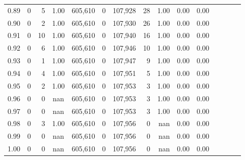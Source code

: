 \begin{tabular}{rrrcrrrrrrrrrrr}
0.89 &       0 &      5 &                                       1.00 &  605,610 &        0 &  107,928 &       28 &  1.00 &  0.00 &                         0.00 \\
0.90 &       0 &      2 &                                       1.00 &  605,610 &        0 &  107,930 &       26 &  1.00 &  0.00 &                         0.00 \\
0.91 &       0 &     10 &                                       1.00 &  605,610 &        0 &  107,940 &       16 &  1.00 &  0.00 &                         0.00 \\
0.92 &       0 &      6 &                                       1.00 &  605,610 &        0 &  107,946 &       10 &  1.00 &  0.00 &                         0.00 \\
0.93 &       0 &      1 &                                       1.00 &  605,610 &        0 &  107,947 &        9 &  1.00 &  0.00 &                         0.00 \\
0.94 &       0 &      4 &                                       1.00 &  605,610 &        0 &  107,951 &        5 &  1.00 &  0.00 &                         0.00 \\
0.95 &       0 &      2 &                                       1.00 &  605,610 &        0 &  107,953 &        3 &  1.00 &  0.00 &                         0.00 \\
0.96 &       0 &      0 &                                        nan &  605,610 &        0 &  107,953 &        3 &  1.00 &  0.00 &                         0.00 \\
0.97 &       0 &      0 &                                        nan &  605,610 &        0 &  107,953 &        3 &  1.00 &  0.00 &                         0.00 \\
0.98 &       0 &      3 &                                       1.00 &  605,610 &        0 &  107,956 &        0 &   nan &  0.00 &                         0.00 \\
0.99 &       0 &      0 &                                        nan &  605,610 &        0 &  107,956 &        0 &   nan &  0.00 &                         0.00 \\
1.00 &       0 &      0 &                                        nan &  605,610 &        0 &  107,956 &        0 &   nan &  0.00 &                         0.00 \\
\bottomrule
\end{tabular}
